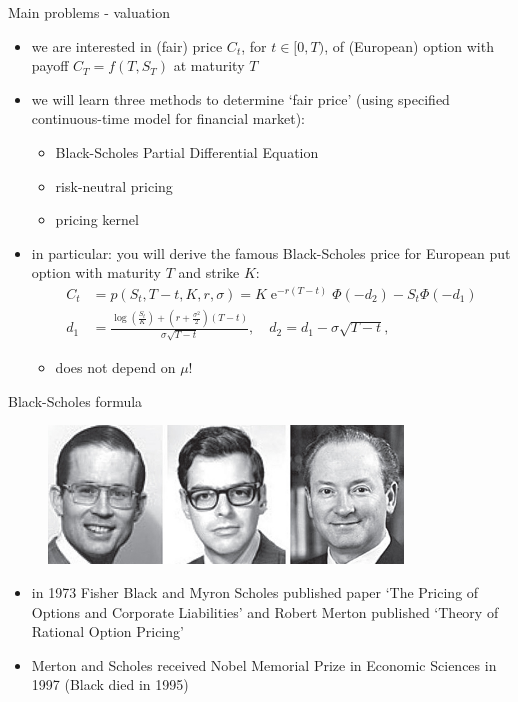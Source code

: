 \documentclass[pdf, handout]{beamer}
\newcommand{\e}{\operatorname{e}}
\begin{document}
\begin{frame}{Main problems - valuation}
\begin{itemize}
\item we are interested in (fair) price $C_t$, for $t\in [0,T)$, of (European) option with payoff $C_T=f(T,S_T)$ at maturity $T$
\item we will learn three methods to determine `fair price' (using specified continuous-time model for financial market):
\begin{itemize}
\item Black-Scholes Partial Differential Equation
\item risk-neutral pricing
\item pricing kernel
\end{itemize}
\item in particular: you will derive the famous Black-Scholes price for European put option with maturity $T$ and strike $K$:
{%
\begin{align*}
C_t&=p(S_t,T-t,K,r,\sigma)= K\e^{-r (T-t)} \Phi(-d_2) -    S_t  \Phi(-d_1)
\\
d_1&=\frac{ \log\left(\frac{S_t}{K}\right) + \left( r+ \frac{\sigma^2}{2}\right) (T-t)}{ \sigma \sqrt{T-t}}, \quad d_2=d_1-\sigma \sqrt{T-t},
\end{align*}
}
\begin{itemize}
\item does not depend on $\mu$!
\end{itemize}
\end{itemize}
\end{frame}
%
\begin{frame}{Black-Scholes formula}
\begin{figure}
\includegraphics[width=0.84\textwidth]{BSM}
\end{figure}
\begin{itemize}
\item in 1973 Fisher Black and Myron Scholes published paper
`The Pricing of Options and Corporate Liabilities'  and Robert Merton
published `Theory of Rational Option Pricing'
\item Merton and Scholes received Nobel Memorial Prize in Economic Sciences in 1997 (Black died in 1995)
\end{itemize}
\end{frame}
\end{document}
